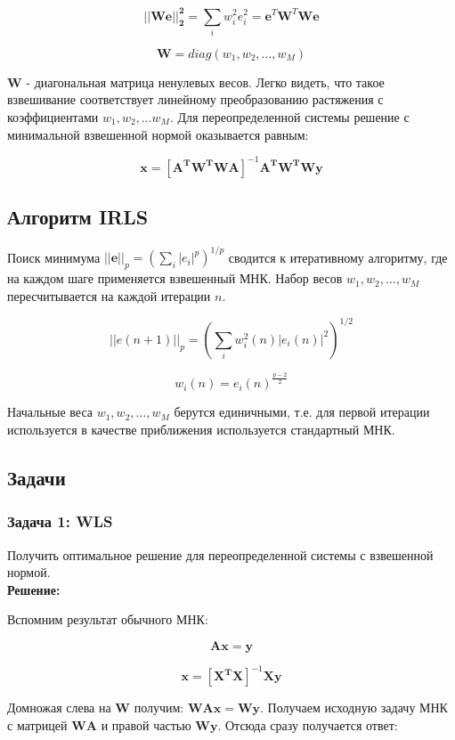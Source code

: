 {\[
    \boldsymbol{||W e||_2^2} = \sum_i w_i^2 e_i^2 = \boldsymbol{e}^T \boldsymbol{W}^T \boldsymbol{W} \boldsymbol{e}
\]

\[
    \boldsymbol{W} = diag(w_1, w_2, \dots, w_M)
\]

$\boldsymbol{W}$ - диагональная матрица ненулевых весов. Легко видеть, что такое взвешивание соответствует линейному преобразованию растяжения с коэффициентами $w_1, w_2, \dots w_M$. Для переопределенной системы решение с минимальной взвешенной нормой оказывается равным:

\[
    \boldsymbol{x} = \left[ \boldsymbol{A^T W^T W A} \right]^{-1} \boldsymbol{A^T W^T W y}
\]

\subsection{Алгоритм \textbf{IRLS}}

Поиск минимума $||\boldsymbol{e}||_p = \left( \sum_i |e_i|^p \right)^{1/p}$ сводится к итеративному алгоритму, где на каждом шаге применяется взвешенный МНК. Набор весов $w_1, w_2, \dots, w_M$ пересчитывается на каждой итерации $n$.

\[
    ||e(n +1)||_p = \left( \sum_i w_i^2(n) |e_i(n)|^2 \right)^{1/2}
\]

\[
    w_i(n) = e_i(n)^{\frac{p - 2}{2}}
\]

Начальные веса $w_1, w_2, \dots, w_M$ берутся единичными, т.е. для первой итерации используется в качестве приближения используется стандартный МНК.

\subsection{Задачи}

\subsubsection{Задача 1: WLS}

Получить оптимальное решение для переопределенной системы с взвешенной нормой. \\

\textbf{Решение:}

Вспомним результат обычного МНК:

\[
    \boldsymbol{A} \boldsymbol{x} = \boldsymbol{y}
\]

\[
    \boldsymbol{x} = \left[\boldsymbol{X^T X}\right]^{-1} \boldsymbol{X y}
\]

Домножая слева на $\boldsymbol{W}$ получим: $\boldsymbol{W} \boldsymbol{A} \boldsymbol{x} = \boldsymbol{W} \boldsymbol{y}$. Получаем исходную задачу МНК с матрицей $\boldsymbol{W} \boldsymbol{A}$ и правой частью $\boldsymbol{W} \boldsymbol{y}$. Отсюда сразу получается ответ:

}
